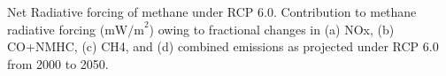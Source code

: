 Net Radiative forcing of methane under RCP 6.0. Contribution to methane radiative forcing ($\mathrm{mW/m}^2$) owing to fractional changes in  (a) NOx, (b) CO+NMHC, (c) CH4, and (d) combined emissions as projected under RCP 6.0 from 2000 to 2050. \label{fig:eqems}